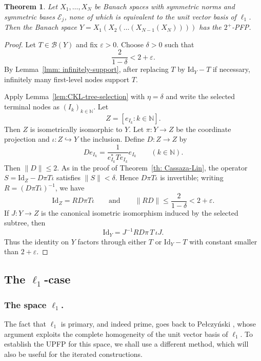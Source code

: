 \documentclass[11pt]{amsart}
\theoremstyle{plain}
\newtheorem{theorem}{Theorem}[section]
\theoremstyle{definition}
\numberwithin{equation}{section}
\newcommand{\Bop}{\mathcal{B}}
\newcommand{\N}{\mathbb{N}}
\newcommand{\Id}{\mathrm{Id}}
\renewcommand{\le}{\leqslant}
\begin{document}
\begin{theorem}\label{th: Cassaza-Kottman-Lin}
    Let $X_1, \dots, X_N$ be Banach spaces with symmetric norms and symmetric bases $\mathcal{E}_j$, none of which is equivalent to the unit vector basis of $\ell_1$. Then the Banach space $Y = X_1(X_{2}(\dots (X_{N-1}(X_N))))$ has the $2^+$-PFP.
\end{theorem}
\begin{proof}
    Let $T\in\Bop(Y)$ and fix $\varepsilon>0$. Choose $\delta>0$ such that
    \[
        \frac{2}{1-\delta}<2+\varepsilon.
    \]
    By Lemma~\ref{lmm: infinitely-support}, after replacing $T$ by $\Id_Y-T$ if necessary, infinitely many first-level nodes support $T$.
    
    Apply Lemma~\ref{lem:CKL-tree-selection} with $\eta=\delta$ and write the selected terminal nodes as $(I_k)_{k\in\N}$. Let
    \[
        Z=[e_{I_k}:k\in\N].
    \]
    Then $Z$ is isometrically isomorphic to $Y$. Let $\pi\colon Y\to Z$ be the coordinate projection and $\iota\colon Z\hookrightarrow Y$ the inclusion. Define $D\colon Z\to Z$ by
    \[
        De_{I_k}=\frac{1}{e_{I_k}^*Te_{I_k}}e_{I_k}
        \qquad(k\in\N).
    \]
    Then $\|D\|\le 2$. As in the proof of Theorem~\ref{th: Cassaza-Lin}, the operator
    \(
        S=\Id_Z-D\pi T\iota
    \)
    satisfies $\|S\|<\delta$. Hence $D\pi T\iota$ is invertible; writing $R=(D\pi T\iota)^{-1}$, we have
    \[
        \Id_Z=R D\pi T\iota
        \qquad\text{and}\qquad
        \|RD\|\le \frac{2}{1-\delta}<2+\varepsilon.
    \]
    If $J\colon Y\to Z$ is the canonical isometric isomorphism induced by the selected subtree, then
    \[
        \Id_Y=J^{-1}RD\pi\,T\,\iota J.
    \]
    Thus the identity on $Y$ factors through either $T$ or $\Id_Y-T$ with constant smaller than $2+\varepsilon$.
\end{proof}



\subsection{The \texorpdfstring{$\ell_1$}{l-1}-case} \label{subsec: l_1-case-separable} 


\subsubsection{The space $\ell_1$. } The fact that $\ell_1$ is primary, and indeed prime, goes back to Pe{\l}czy\'nski \cite{Pelczynski1960}, whose argument exploits the complete homogeneity of the unit vector basis of $\ell_1$. To establish the UPFP for this space, we shall use a different method, which will also be useful for the iterated constructions.
\end{document}
